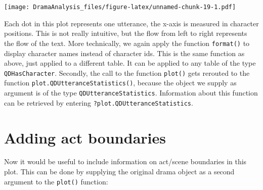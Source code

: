 \documentclass[]{book}
\newenvironment{Shaded}{\begin{snugshade}}{\end{snugshade}}
\newcommand{\CommentTok}[1]{\textcolor[rgb]{0.56,0.35,0.01}{\textit{#1}}}
\newcommand{\DataTypeTok}[1]{\textcolor[rgb]{0.13,0.29,0.53}{#1}}
\newcommand{\DecValTok}[1]{\textcolor[rgb]{0.00,0.00,0.81}{#1}}
\newcommand{\FloatTok}[1]{\textcolor[rgb]{0.00,0.00,0.81}{#1}}
\newcommand{\KeywordTok}[1]{\textcolor[rgb]{0.13,0.29,0.53}{\textbf{#1}}}
\newcommand{\NormalTok}[1]{#1}
\newcommand{\OperatorTok}[1]{\textcolor[rgb]{0.81,0.36,0.00}{\textbf{#1}}}
\newcommand{\StringTok}[1]{\textcolor[rgb]{0.31,0.60,0.02}{#1}}
\begin{document}
\begin{Shaded}
\end{Shaded}

\texttt{[image: DramaAnalysis\_files/figure-latex/unnamed-chunk-19-1.pdf]}

Each dot in this plot represents one utterance, the x-axis is measured in character positions. This is not really intuitive, but the flow from left to right represents the flow of the text. More technically, we again apply the function \texttt{format()} to display character names instead of character ids. This is the same function as above, just applied to a different table. It can be applied to any table of the type \texttt{QDHasCharacter}. Secondly, the call to the function \texttt{plot()} gets rerouted to the function \texttt{plot.QDUtteranceStatistics()}, because the object we supply as argument is of the type \texttt{QDUtteranceStatistics}. Information about this function can be retrieved by entering \texttt{?plot.QDUtteranceStatistics}.

\hypertarget{adding-act-boundaries}{%
\section{Adding act boundaries}\label{adding-act-boundaries}}

Now it would be useful to include information on act/scene boundaries in this plot. This can be done by supplying the original drama object as a second argument to the \texttt{plot()} function:

\begin{Shaded}
\end{Shaded}
\end{document}
